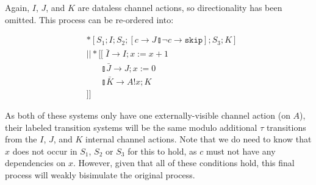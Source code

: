 \documentclass[times, 10pt]{article}
\begin{document}
Again, $I$, $J$, and $K$ are dataless channel actions, so directionality has
been omitted. This process can be re-ordered into:

\begin{align*}
& *[S_1; I; S_2; [ c \rightarrow J \talloblong \lnot c \rightarrow \texttt{skip} ]; S_3; K] \\
& || *[[\;\bar{I} \rightarrow I; x := x + 1 \\
&\;\;\;\;\;\;\talloblong \bar{J} \rightarrow J; x := 0 \\
&\;\;\;\;\;\;\talloblong \bar{K} \rightarrow  A!x; K \\
&]]
\end{align*}

As both of these systems only have one externally-visible channel action (on
$A$), their labeled transition systems will be the same modulo additional $\tau$
transitions from the $I$, $J$, and $K$ internal channel actions. Note that we do
need to know that $x$ does not occur in $S_1$, $S_2$ or $S_3$ for this to hold,
as $c$ must not have any dependencies on $x$. However, given that all of these
conditions hold, this final process will weakly bisimulate the original process.
\end{document}
